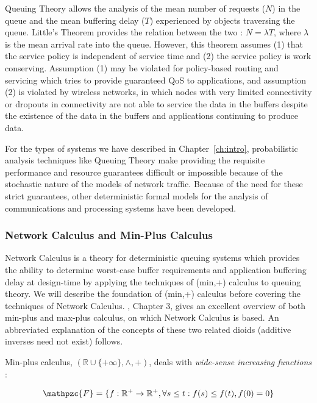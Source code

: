Queuing Theory allows the analysis of the mean number of requests
($N$) in the queue and the mean buffering delay ($T$) experienced by
objects traversing the queue.  Little's Theorem provides the relation
between the two : $N=\lambda T$\cite{littleTheorem}, where $\lambda$
is the mean arrival rate into the queue.  However, this theorem
assumes (1) that the service policy is independent of service time and
(2) the service policy is work conserving.  Assumption (1) may be
violated for policy-based routing and servicing which tries to provide
guaranteed QoS to applications, and assumption (2) is violated by
wireless networks, in which nodes with very limited connectivity or
dropouts in connectivity are not able to service the data in the
buffers despite the existence of the data in the buffers and
applications continuing to produce data.

For the types of systems we have described in Chapter~\ref{ch:intro},
probabilistic analysis techniques like Queuing Theory make providing
the requisite performance and resource guarantees difficult or
impossible because of the stochastic nature of the models of network
traffic\cite{NC_Cruz1991}.  Because of the need for these strict
guarantees, other deterministic formal models for the analysis of
communications and processing systems have been developed.

\subsubsection{Network Calculus and Min-Plus Calculus}
Network Calculus\cite{NC_Cruz1991}\cite{NC_Cruz1991a}\cite{NCBook} is
a theory for deterministic queuing systems which provides the ability
to determine worst-case buffer requirements and application buffering
delay at design-time by applying the techniques of (min,+) calculus to
queuing theory.  We will describe the foundation of (min,+) calculus
before covering the techniques of Network Calculus. \cite{NCBook},
Chapter 3, gives an excellent overview of both min-plus and max-plus
calculus, on which Network Calculus is based.  An abbreviated
explanation of the concepts of these two related dioids (additive
inverses need not exist) follows.

Min-plus calculus, $(\mathbb{R}\cup\{+\infty\},\wedge,+)$, deals with
\textit{wide-sense increasing functions} :

\begin{equation}
  \mathpzc{F}=\{f : \mathbb{R}^+ \rightarrow \mathbb{R}^+, \forall s
  \leq t : f(s) \leq f(t), f(0) = 0\}
\end{equation}

